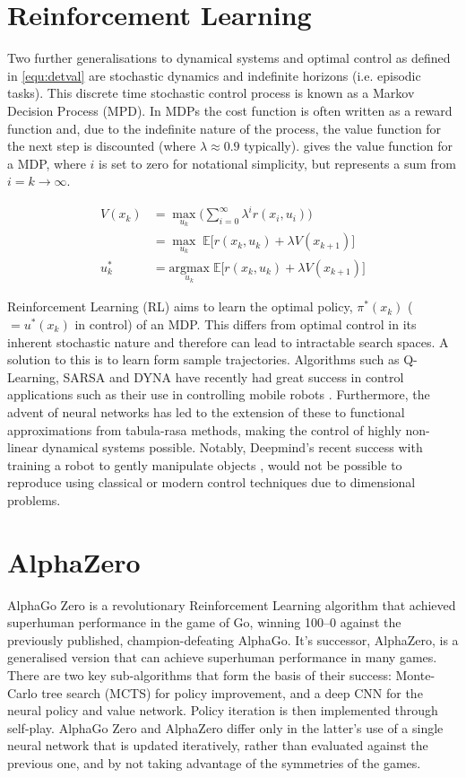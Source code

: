 \documentclass[../main.tex]{subfiles}
\begin{document}
\section{Reinforcement Learning}
Two further generalisations to dynamical systems and optimal control as defined in \cref{equ:detval} are stochastic dynamics and indefinite horizons (i.e. episodic tasks). This discrete time stochastic control process is known as a Markov Decision Process (MPD). In MDPs the cost function is often written as a reward function and, due to the indefinite nature of the process, the value function for the next step is discounted (where $\lambda \approx 0.9$ typically).  gives the value function for a MDP, where $i$ is set to zero for notational simplicity, but represents a sum from $i=k \rightarrow \infty$. 

\begin{align}
    \label{equ:mdpval} 
    V(x_k) & = \underset{u_k}{\max} \bigg( \sum_{i=0}^{\infty} \lambda^{i} r(x_i, u_i) \bigg) \\ 
    & = \underset{u_k}{\max} \; \mathbb{E} \Big[ r(x_k, u_k) + \lambda V(x_{k+1}) \Big] \\
    u^{*}_k & = \underset{u_k}{\text{argmax}}\; \mathbb{E} \Big[ r(x_k, u_k) + \lambda V(x_{k+1}) \Big]
\end{align}

Reinforcement Learning (RL) aims to learn the optimal policy, $\pi^{*}(x_k)$ ($=u^{*}(x_k)$ in control) of an MDP. This differs from optimal control in its inherent stochastic nature and therefore can lead to intractable search spaces. A solution to this is to learn form sample trajectories. Algorithms such as Q-Learning, SARSA and DYNA have recently had great success in control applications such as their use in controlling mobile robots \cite{Qlearning, RLoverview}. Furthermore, the advent of neural networks has led to the extension of these to functional approximations from tabula-rasa methods, making the control of highly non-linear dynamical systems possible. Notably, Deepmind's recent success with training a robot to gently manipulate objects \cite{Robothand}, would not be possible to reproduce using classical or modern control techniques due to dimensional problems.

\section{AlphaZero}
AlphaGo Zero is a revolutionary Reinforcement Learning algorithm that achieved superhuman performance in the game of Go, winning 100–0 against the previously published, champion-defeating AlphaGo. It's successor, AlphaZero, is a generalised version that can achieve superhuman performance in many games. There are two key sub-algorithms that form the basis of their success: Monte-Carlo tree search (MCTS) for policy improvement, and a deep CNN for the neural policy and value network. Policy iteration is then implemented through self-play. AlphaGo Zero and AlphaZero differ only in the latter's use of a single neural network that is updated iteratively, rather than evaluated against the previous one, and by not taking advantage of the symmetries of the games.
\end{document}
